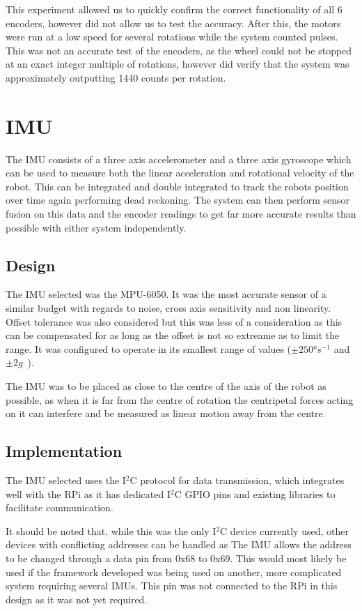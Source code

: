 This experiment allowed us to quickly confirm the correct functionality
of all 6 encoders, however did not allow us to test the accuracy. After
this, the motors were run at a low speed for several rotations while the
system counted pulses. This was not an accurate test of the encoders, as
the wheel could not be stopped at an exact integer multiple of rotations,
however did verify that the system was approximately outputting 1440
counts per rotation.

\section{IMU}\label{elec/imu}
The IMU consists of a three axis accelerometer and a three axis gyroscope
which can be used to measure both the linear acceleration and rotational
velocity of the robot. This can be integrated and double integrated to
track the robots position over time again performing dead reckoning. The
system can then perform sensor fusion on this data and the encoder
readings to get far more accurate results than possible with either system
independently.

\subsection{Design}\label{elec/imu/design}
The IMU selected was the MPU-6050. It was the most accurate sensor of a
similar budget with regards to noise, cross axis sensitivity and non
linearity. Offset tolerance was also considered but this was less of a
consideration as this can be compensated for as long as the offset is not
so extreame as to limit the range. It was configured to operate in its
smallest range of values ($\pm\ang{250}s^{-1}$ and $\pm2g$~\cite{MPU6050Datasheet}).

The IMU was to be placed as close to the centre of the axis of the robot
as possible, as when it is far from the centre of rotation the centripetal
forces acting on it can interfere and be measured as linear motion away
from the centre.

\subsection{Implementation}\label{elec/imu/impl}
The IMU selected uses the I$^2$C protocol for data transmission, which
integrates well with the RPi as it has dedicated I$^2$C GPIO pins and
existing libraries to facilitate communication.

It should be noted that, while this was the only I$^2$C device currently
used, other devices with conflicting addresses can be handled as The IMU
allows the address to be changed through a data pin from 0x68 to 0x69.
This would most likely be used if the framework developed was being used
on another, more complicated system requiring several IMUs. This pin was
not connected to the RPi in this design as it was not yet required.

